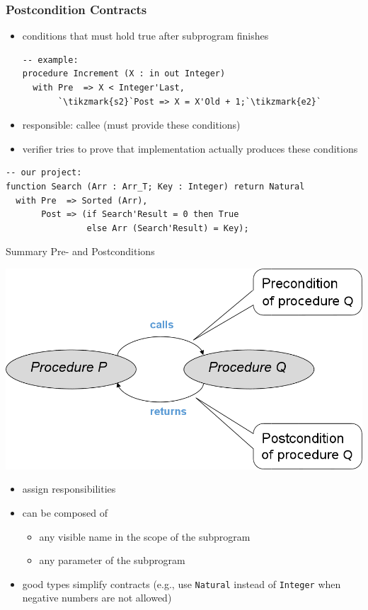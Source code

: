 \begin{frame}
  \frametitle{Postcondition Contracts}
  \begin{itemize}
  \item conditions that must hold true after subprogram finishes
\begin{lstlisting}[escapechar=\`]
-- example:
procedure Increment (X : in out Integer)
  with Pre  => X < Integer'Last,
       `\tikzmark{s2}`Post => X = X'Old + 1;`\tikzmark{e2}`
\end{lstlisting}
  \item responsible: callee (must provide these conditions)
  \item verifier tries to prove that implementation actually produces these conditions
  \end{itemize}

\begin{lstlisting}
-- our project:
function Search (Arr : Arr_T; Key : Integer) return Natural
  with Pre  => Sorted (Arr),
       Post => (if Search'Result = 0 then True 
                else Arr (Search'Result) = Key);
\end{lstlisting}
\end{frame}
\addtocounter{clock}{2}

\begin{frame}[fragile]{Summary Pre- and Postconditions}
  \begin{center}
    \includegraphics[width=.7\textwidth]{content/images/spark/pre-post}    
  \end{center}
  \vspace{-2em}\begin{itemize}
  \item assign responsibilities
  \item can be composed of
    \begin{itemize}
    \item any visible name in the scope of the subprogram
    \item any parameter of the subprogram
    \end{itemize}
  \item good types simplify contracts (e.g., use \texttt{Natural} instead of \texttt{Integer} when negative numbers are not allowed)
  \end{itemize}
\end{frame}
\addtocounter{clock}{2}

